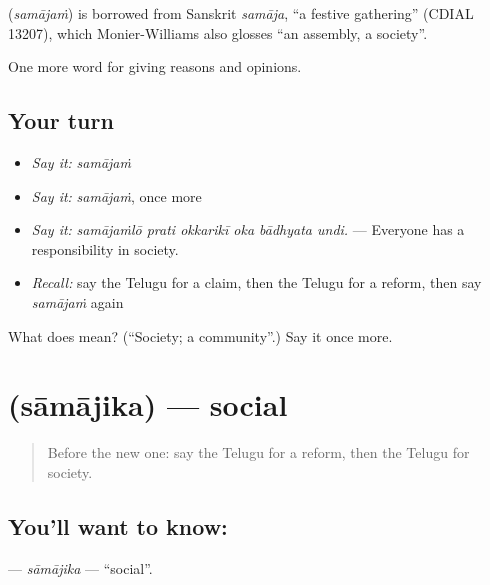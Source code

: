 \begin{cousinweb}
\textbf{} (\emph{samājaṁ}) is borrowed from Sanskrit \emph{samāja}, \textquotedblleft{}a festive gathering\textquotedblright{} (CDIAL 13207), which Monier-Williams also glosses \textquotedblleft{}an assembly, a society\textquotedblright{}.
\end{cousinweb}

\begin{grammarlens}[title={What you've built}]
One more word for giving reasons and opinions.
\end{grammarlens}

\subsection*{Your turn}
\begin{itemize}
\raggedright
  \item \emph{Say it:} \emph{samājaṁ}
  \item \emph{Say it:} \emph{samājaṁ}, once more
  \item \emph{Say it:} \emph{samājaṁlō prati okkarikī oka bādhyata undi.} — Everyone has a responsibility in society.
  \item \emph{Recall:} say the Telugu for a claim, then the Telugu for a reform, then say \emph{samājaṁ} again
\end{itemize}

\begin{tcolorbox}[breakable,colback=teal!4,colframe=teal!35!black,title={Before you move on}]
What does  mean? (\textquotedblleft{}Society; a community\textquotedblright{}.) Say it once more.
\end{tcolorbox}
\section[\texorpdfstring{\te{సామాజిక} (sāmājika)}{సామాజిక (sāmājika)}]{ (sāmājika) — social}

\label{lesson:TE-C408-samajika}



\begin{quote}
Before the new one: say the Telugu for a reform, then the Telugu for society.
\end{quote}

\subsection*{You'll want to know: }
\textbf{} — \emph{sāmājika} — \textquotedblleft{}social\textquotedblright{}.

